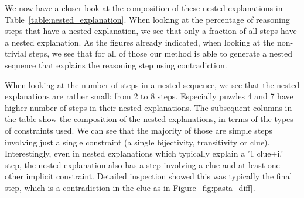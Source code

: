 We now have a closer look at the composition of these nested explanations in Table~\ref{table:nested_explanation}.
When looking at the percentage of reasoning steps that have a nested explanation, we see that only a fraction of all steps have a nested explanation. As the figures already indicated, when looking at the non-trivial steps, we see that for all of those our method is able to generate a nested sequence that explains the reasoning step using contradiction. 



When looking at the number of steps in a nested sequence, we see that the nested explanations are rather small: from 2 to 8 steps. Especially puzzles 4 and 7 have higher number of steps in their nested explanations.
The subsequent columns in the table show the composition of the nested explanations, in terms of the types of constraints used. We can see that the majority of those are simple steps involving just a single constraint (a single bijectivity, transitivity or clue). Interestingly, even in nested explanations which typically explain a '1 clue+i.' step, the nested explanation also has a step involving a clue and at least one other implicit constraint. Detailed inspection showed this was typically the final step, which is a contradiction in the clue as in Figure~\ref{fig:pasta_diff}. 


